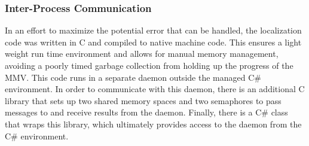 \subsubsection{Inter-Process Communication}
In an effort to maximize the potential error that can be handled, the localization code was written in C and compiled to native machine code.  This ensures a light weight run time environment and allows for manual memory management, avoiding a poorly timed garbage collection from holding up the progress of the MMV.  This code runs in a separate daemon outside the managed C\# environment.  In order to communicate with this daemon, there is an additional C library that sets up two shared memory spaces and two semaphores to pass messages to and receive results from the daemon.  Finally, there is a C\# class that wraps this library, which ultimately provides access to the daemon from the C\# environment.
